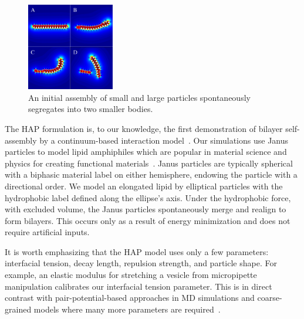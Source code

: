 \begin{figure}
\centerline{\includegraphics[width=0.34\textwidth]{figures/PW_fig2.pdf}}
  \vspace{-8pt}
  \caption{\label{fig:demixing} \footnotesize An initial assembly of
  small and large particles spontaneously segregates into two smaller
  bodies.}
\end{figure}
The HAP formulation is, to our knowledge, the first demonstration of
bilayer self-assembly by a continuum-based interaction
model~\cite{Noguchi2001, Farago2003, Brannigan2006, Brooks2009,
Wang2013}. Our simulations use Janus particles to model lipid
amphiphiles which are popular in material science and physics for
creating functional materials~\cite{Lee2014, Lee2013}. Janus particles
are typically spherical with a biphasic material label on either
hemisphere, endowing the particle with
a directional order. We model an
elongated lipid by elliptical particles with the hydrophobic label
defined along the ellipse's axis. 
Under the hydrophobic force, with
excluded volume, the Janus particles spontaneously merge and realign
to form bilayers. This occurs only as a result of energy minimization
and does not require artificial inputs.
%

%
It is worth emphasizing that the HAP model uses only a few parameters:
interfacial tension, decay length, repulsion strength, and particle
shape. For example, an elastic modulus for stretching a vesicle from
micropipette manipulation calibrates our interfacial tension
parameter. This is in direct contrast with pair-potential-based
approaches in MD simulations and coarse-grained models where many more
parameters are required~\cite{Varilly2011, Wang2013}.


